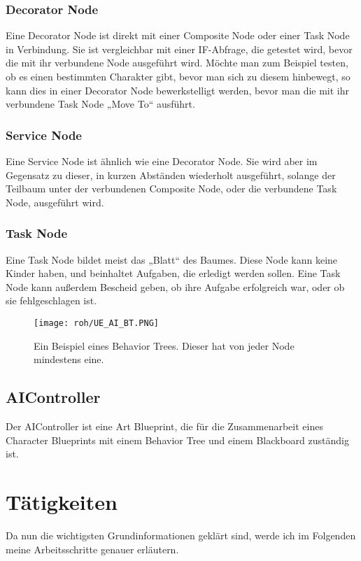 \subsubsection{Decorator Node}
Eine Decorator Node ist direkt mit einer Composite Node oder einer Task Node in Verbindung.
Sie ist vergleichbar mit einer IF-Abfrage, die getestet wird, bevor die mit ihr verbundene Node ausgeführt wird.
Möchte man zum Beispiel testen, ob es einen bestimmten Charakter gibt, bevor man sich zu diesem hinbewegt, so kann dies in einer Decorator Node bewerkstelligt werden, bevor man die mit ihr verbundene Task Node „Move To“ ausführt.
\subsubsection{Service Node}
Eine Service Node ist ähnlich wie eine Decorator Node.
Sie wird aber im Gegensatz zu dieser, in kurzen Abständen wiederholt ausgeführt, solange der Teilbaum unter der verbundenen Composite Node, oder die verbundene Task Node, ausgeführt wird.
\subsubsection{Task Node}
Eine Task Node bildet meist das „Blatt“ des Baumes.
Diese Node kann keine Kinder haben, und beinhaltet Aufgaben, die erledigt werden sollen. Eine Task Node kann außerdem Bescheid geben, ob ihre Aufgabe erfolgreich war, oder ob sie fehlgeschlagen ist.
\begin{figure}[H]
    \centering
    \texttt{[image: roh/UE\_AI\_BT.PNG]}
    \caption{Ein Beispiel eines Behavior Trees. Dieser hat von jeder Node mindestens eine.}
    \label{UE:AI_BT}
\end{figure}
\subsection{AIController}
Der AIController ist eine Art Blueprint, die für die Zusammenarbeit eines Character Blueprints mit einem Behavior Tree und einem Blackboard zuständig ist.\citep{ue:AIAIController}

\section{Tätigkeiten}
Da nun die wichtigsten Grundinformationen geklärt sind, werde ich im Folgenden meine Arbeitsschritte genauer erläutern.
